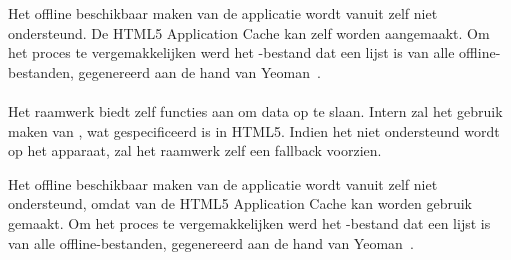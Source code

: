     

Het offline beschikbaar maken van de applicatie wordt vanuit \kendo{} zelf niet ondersteund.
De HTML5 Application Cache kan zelf worden aangemaakt.
Om het proces te vergemakkelijken werd het -bestand dat een lijst is van alle offline-bestanden, gegenereerd aan de hand van Yeoman~\cite{Yeoman2013}.

\paragraph{\lungo}
Het raamwerk biedt zelf functies aan om data op te slaan.
Intern zal het gebruik maken van , wat gespecificeerd is in HTML5.
Indien het niet ondersteund wordt op het apparaat, zal het raamwerk zelf een fallback voorzien.

Het offline beschikbaar maken van de applicatie wordt vanuit \lungo{} zelf niet ondersteund, omdat van de HTML5 Application Cache kan worden gebruik gemaakt.
Om het proces te vergemakkelijken werd het -bestand dat een lijst is van alle offline-bestanden, gegenereerd aan de hand van Yeoman~\cite{Yeoman2013}.


